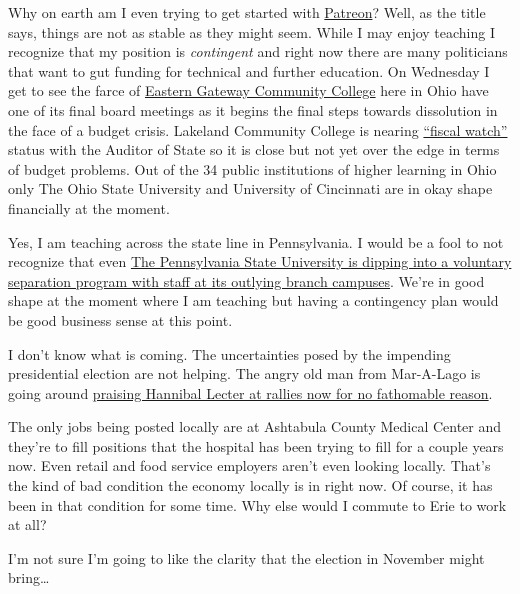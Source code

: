 Why on earth am I even trying to get started with
\href{https://patreon.com/erielookingproductions?utm_medium=unknown&utm_source=join_link&utm_campaign=creatorshare_creator&utm_content=copyLink}{Patreon}?
Well, as the title says, things are not as stable as they might seem.
While I may enjoy teaching I recognize that my position is
\emph{contingent} and right now there are many politicians that want to
gut funding for technical and further education. On Wednesday I get to
see the farce of
\href{https://web.archive.org/web/20240512220301/https://www.wtrf.com/news/education/local-college-offering-scholarships-to-students-involved-in-eastern-gateway-community-college-upheaval/}{Eastern
Gateway Community College} here in Ohio have one of its final board
meetings as it begins the final steps towards dissolution in the face of
a budget crisis. Lakeland Community College is nearing
\href{https://web.archive.org/web/20240512130552/https://ohioauditor.gov/fiscal/local.html}{``fiscal
watch''} status with the Auditor of State so it is close but not yet
over the edge in terms of budget problems. Out of the 34 public
institutions of higher learning in Ohio only The Ohio State University
and University of Cincinnati are in okay shape financially at the
moment.

Yes, I am teaching across the state line in Pennsylvania. I would be a
fool to not recognize that even
\href{https://web.archive.org/web/20240512122317/https://www.wesa.fm/education/2024-05-12/penn-state-commonwealth-campus-buyouts-budget-cuts}{The
Pennsylvania State University is dipping into a voluntary separation
program with staff at its outlying branch campuses}. We're in good shape
at the moment where I am teaching but having a contingency plan would be
good business sense at this point.

I don't know what is coming. The uncertainties posed by the impending
presidential election are not helping. The angry old man from Mar-A-Lago
is going around
\href{https://web.archive.org/web/20240513140912/https://www.independent.co.uk/news/world/americas/us-politics/trump-hannibal-lecter-new-jersey-rally-b2544094.html}{praising
Hannibal Lecter at rallies now for no fathomable reason}.

The only jobs being posted locally are at Ashtabula County Medical
Center and they're to fill positions that the hospital has been trying
to fill for a couple years now. Even retail and food service employers
aren't even looking locally. That's the kind of bad condition the
economy locally is in right now. Of course, it has been in that
condition for some time. Why else would I commute to Erie to work at
all?

I'm not sure I'm going to like the clarity that the election in November
might bring\ldots{}
